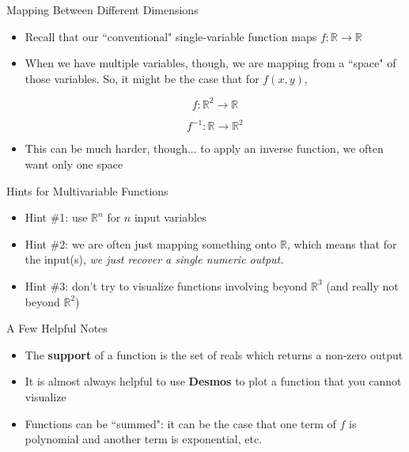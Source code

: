 \documentclass[10pt]{beamer}
\begin{document}
\begin{frame}{Mapping Between Different Dimensions}
\begin{itemize}
    \item Recall that our ``conventional" single-variable function maps $f: \mathbb{R} \rightarrow \mathbb{R}$
    \item When we have multiple variables, though, we are mapping from a ``space" of those variables. So, it might be the case that for $f(x,y)$,

    \[f: \mathbb{R}^2 \rightarrow \mathbb{R}\]

    \[f^{-1}: \mathbb{R} \rightarrow \mathbb{R}^2\]

    \item This can be much harder, though... to apply an inverse function, we often want only one space

\end{itemize}
\end{frame}

\begin{frame}{Hints for Multivariable Functions}
\begin{itemize}
    \item Hint \#1: use $\mathbb{R}^n$ for $n$ input variables \pause
    \item Hint \#2: we are often just mapping something onto $\mathbb{R}$, which means that for the input(s), \textit{we just recover a single numeric output.} \pause
    \item Hint \#3: don't try to visualize functions involving beyond $\mathbb{R}^3$ (and really not beyond $\mathbb{R}^2$)
\end{itemize}
\end{frame}


\begin{frame}{A Few Helpful Notes}
\begin{itemize}
    \item The \textbf{support} of a function is the set of reals which returns a non-zero output
    \item It is almost always helpful to use \textbf{Desmos} to plot a function that you cannot visualize
    \item Functions can be ``summed": it can be the case that one term of $f$ is polynomial and another term is exponential, etc.
\end{itemize}
    
\end{frame}
\end{document}
